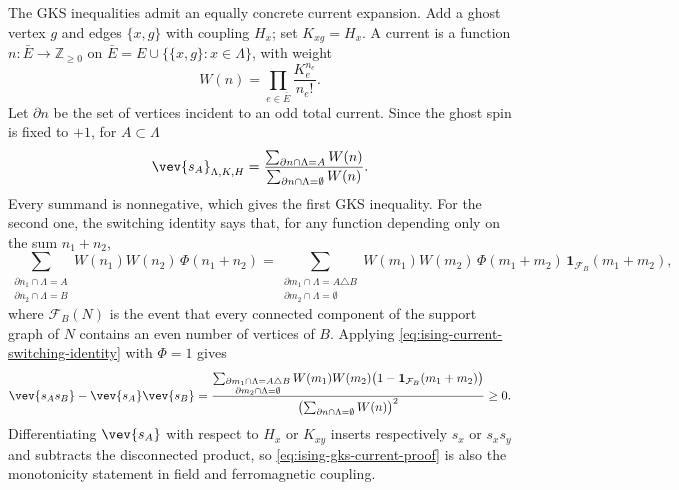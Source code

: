 The GKS inequalities admit an equally concrete current expansion.  Add a
ghost vertex \(g\) and edges \(\{x,g\}\) with coupling \(H_x\); set
\(K_{xg}=H_x\).  A current is a function
\(n:\bar E\to\mathbb Z_{\ge0}\) on
\(\bar E=E\cup\{\{x,g\}:x\in\Lambda\}\), with weight
\[
  W(n)=\prod_{e\in\bar E}\frac{K_e^{n_e}}{n_e!}.
\]
Let \(\partial n\) be the set of vertices incident to an odd total current.
Since the ghost spin is fixed to \(+1\), for \(A\subset\Lambda\)
\begin{equation}
  \vev{s_A}_{\Lambda,K,H}
  =
  \frac{
    \sum_{\partial n\cap\Lambda=A} W(n)
  }{
    \sum_{\partial n\cap\Lambda=\emptyset} W(n)
  } .
  \label{eq:ising-random-current-one-point}
\end{equation}
Every summand is nonnegative, which gives the first GKS inequality.  For the
second one, the switching identity says that, for any function depending only
on the sum \(n_1+n_2\),
\begin{equation}
  \sum_{\substack{\partial n_1\cap\Lambda=A\\
                  \partial n_2\cap\Lambda=B}}
  W(n_1)W(n_2)\,\Phi(n_1+n_2)
  =
  \sum_{\substack{\partial m_1\cap\Lambda=A\triangle B\\
                  \partial m_2\cap\Lambda=\emptyset}}
  W(m_1)W(m_2)\,\Phi(m_1+m_2)\,
  \mathbf 1_{\mathcal F_B}(m_1+m_2),
  \label{eq:ising-current-switching-identity}
\end{equation}
where \(\mathcal F_B(N)\) is the event that every connected component of the
support graph of \(N\) contains an even number of vertices of \(B\).  Applying
\eqref{eq:ising-current-switching-identity} with \(\Phi=1\) gives
\begin{equation}
  \vev{s_A s_B}-\vev{s_A}\vev{s_B}
  =
  \frac{
    \sum_{\substack{\partial m_1\cap\Lambda=A\triangle B\\
                    \partial m_2\cap\Lambda=\emptyset}}
    W(m_1)W(m_2)
    \bigl(1-\mathbf 1_{\mathcal F_B}(m_1+m_2)\bigr)
  }{
    \left(
      \sum_{\partial n\cap\Lambda=\emptyset} W(n)
    \right)^2
  }
  \geq0 .
  \label{eq:ising-gks-current-proof}
\end{equation}
Differentiating \(\vev{s_A}\) with respect to \(H_x\) or \(K_{xy}\) inserts
respectively \(s_x\) or \(s_xs_y\) and subtracts the disconnected product, so
\eqref{eq:ising-gks-current-proof} is also the monotonicity statement in
field and ferromagnetic coupling.

